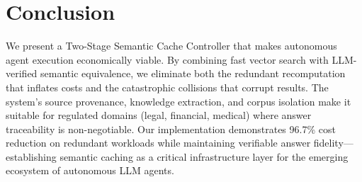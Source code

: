 \documentclass[11pt,twocolumn]{article}
\begin{document}
\section{Conclusion}
\label{sec:conclusion}

We present a Two-Stage Semantic Cache Controller that makes autonomous agent execution economically viable. By combining fast vector search with LLM-verified semantic equivalence, we eliminate both the redundant recomputation that inflates costs and the catastrophic collisions that corrupt results. The system's source provenance, knowledge extraction, and corpus isolation make it suitable for regulated domains (legal, financial, medical) where answer traceability is non-negotiable. Our implementation demonstrates 96.7\% cost reduction on redundant workloads while maintaining verifiable answer fidelity---establishing semantic caching as a critical infrastructure layer for the emerging ecosystem of autonomous LLM agents.


\end{document}
